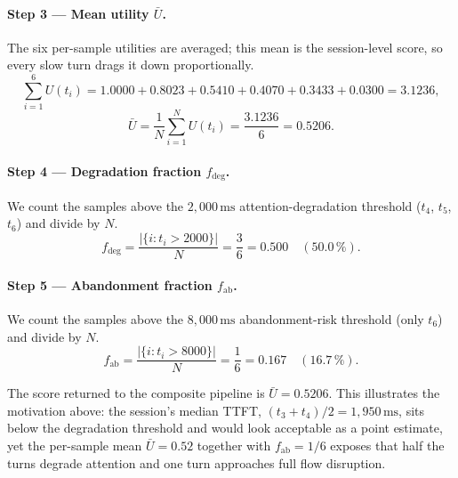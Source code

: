 \documentclass[11pt,a4paper]{article}
\begin{document}
\paragraph{Step 3 --- Mean utility $\bar{U}$.}
The six per-sample utilities are averaged; this mean is the session-level
score, so every slow turn drags it down proportionally.
\[
  \sum_{i=1}^{6} U(t_i)
  = 1.0000 + 0.8023 + 0.5410 + 0.4070 + 0.3433 + 0.0300
  = 3.1236,
\]
\[
  \bar{U} = \frac{1}{N}\sum_{i=1}^{N} U(t_i)
          = \frac{3.1236}{6}
          = 0.5206.
\]

\paragraph{Step 4 --- Degradation fraction $f_{\text{deg}}$.}
We count the samples above the $2{,}000\,\text{ms}$ attention-degradation
threshold ($t_4$, $t_5$, $t_6$) and divide by $N$.
\[
  f_{\text{deg}} = \frac{|\{i : t_i > 2000\}|}{N}
                 = \frac{3}{6}
                 = 0.500 \quad (50.0\,\%).
\]

\paragraph{Step 5 --- Abandonment fraction $f_{\text{ab}}$.}
We count the samples above the $8{,}000\,\text{ms}$ abandonment-risk
threshold (only $t_6$) and divide by $N$.
\[
  f_{\text{ab}} = \frac{|\{i : t_i > 8000\}|}{N}
                = \frac{1}{6}
                = 0.167 \quad (16.7\,\%).
\]

The score returned to the composite pipeline is $\bar{U} = 0.5206$.  This
illustrates the motivation above: the session's median TTFT,
$(t_3 + t_4)/2 = 1{,}950\,\text{ms}$, sits below the degradation threshold
and would look acceptable as a point estimate, yet the per-sample mean
$\bar{U} = 0.52$ together with $f_{\text{ab}} = 1/6$ exposes that half the
turns degrade attention and one turn approaches full flow disruption.
\end{document}
